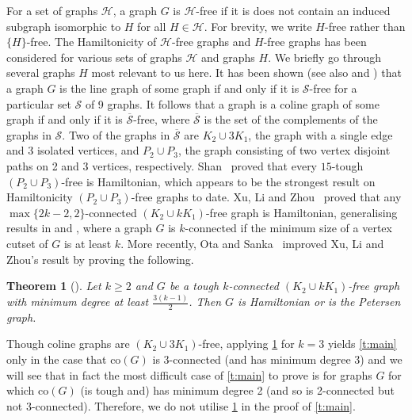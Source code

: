 \documentclass[12pt]{article}
\newtheorem{thm}{Theorem}[section]
\theoremstyle{definition}
\newcommand{\fS}{\mathcal{S}}
\newcommand{\fH}{\mathcal{H}}
\newcommand{\co}{\text{co}}
\begin{document}
For a set of graphs $\fH$, a graph $G$ is $\fH$-free if it is does not contain an induced subgraph isomorphic to $H$ for all $H \in \fH$. For brevity, we write $H$-free rather than $\{H\}$-free.
The Hamiltonicity of $\fH$-free graphs and $H$-free graphs has been considered for various sets of graphs $\fH$ and graphs $H$. We briefly go through several graphs $H$ most relevant to us here.
It has been shown \cite{Be70} (see also \cite{BeBa21} and \cite{RyVr11} ) that a graph $G$ is the line graph of some graph if and only if it is $\fS$-free for a particular set $\fS$ of 9 graphs. It follows that a graph is a coline graph of some graph if and only if it is $\overline{\fS}$-free, where $\overline{\fS}$ is the set of the complements of the graphs in $\fS$. Two of the graphs in $\overline{\fS}$ are $K_2 \cup 3K_1$, the graph with a single edge and 3 isolated vertices, and $P_2 \cup P_3$, the graph consisting of two vertex disjoint paths on 2 and 3 vertices, respectively.
Shan~\cite{Sh21} proved that every $15$-tough $(P_2 \cup P_3)$-free is Hamiltonian, which appears to be the strongest result on Hamiltonicity $(P_2 \cup P_3)$-free graphs to date. 
Xu, Li and Zhou~\cite{XuLiZh24} proved that any $\max\{2k-2,2\}$-connected $(K_2\cup kK_1)$-free graph is Hamiltonian, generalising results in \cite{HaEl} and \cite{ShSh22}, where a graph $G$ is $k$-connected if the minimum size of a vertex cutset of $G$ is at least $k$. More recently, Ota and Sanka~\cite{OtSa24} improved Xu, Li and Zhou's result by proving the following.
\begin{thm}[\cite{OtSa24}]\label{t:OtSa24}
Let $k \geq 2$ and $G$ be a tough $k$-connected $(K_2\cup kK_1)$-free graph with minimum degree at least $\frac{3(k-1)}{2}$. Then $G$ is Hamiltonian or is the Petersen graph.
\end{thm}

\noindent
Though coline graphs are $(K_2\cup 3K_1)$-free,  applying \cref{t:OtSa24} for $k= 3$ yields \cref{t:main} only in the case that $\co(G)$ is 3-connected (and has minimum degree 3) and we will see that in fact the most difficult case of \cref{t:main} to prove is for graphs $G$ for which $\co(G)$ (is tough and) has minimum degree 2 (and so is 2-connected but not 3-connected). 
Therefore, we do not utilise \cref{t:OtSa24} in the proof of \cref{t:main}.
\end{document}
